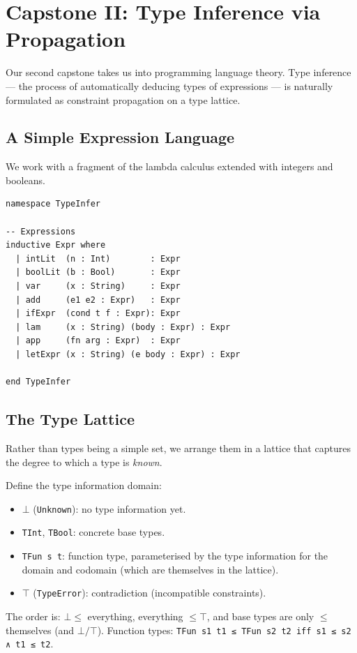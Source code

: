 \documentclass[12pt, a4paper, openright]{book}
\theoremstyle{thmstyle}
\theoremstyle{defstyle}
\newcommand{\lc}[1]{\texttt{#1}}
\newenvironment{defbox}[1][]{%
  \begin{tcolorbox}[defbox, title={Definition\ifx\\#1\\\else\ --- #1\fi}]%
}{\end{tcolorbox}}
\begin{document}
\chapter{Capstone II: Type Inference via Propagation}

Our second capstone takes us into programming language theory.
Type inference --- the process of automatically deducing types of expressions
--- is naturally formulated as constraint propagation on a type lattice.

\section{A Simple Expression Language}

We work with a fragment of the lambda calculus extended with integers and
booleans.

\begin{verbatim}
namespace TypeInfer

-- Expressions
inductive Expr where
  | intLit  (n : Int)        : Expr
  | boolLit (b : Bool)       : Expr
  | var     (x : String)     : Expr
  | add     (e1 e2 : Expr)   : Expr
  | ifExpr  (cond t f : Expr): Expr
  | lam     (x : String) (body : Expr) : Expr
  | app     (fn arg : Expr)  : Expr
  | letExpr (x : String) (e body : Expr) : Expr

end TypeInfer
\end{verbatim}

\section{The Type Lattice}

Rather than types being a simple set, we arrange them in a lattice that
captures the degree to which a type is \emph{known}.

\begin{defbox}[Flat Type Lattice]
  Define the type information domain:
  \begin{itemize}[nosep]
    \item $\bot$ (\lc{Unknown}): no type information yet.
    \item \lc{TInt}, \lc{TBool}: concrete base types.
    \item \lc{TFun s t}: function type, parameterised by the type information
          for the domain and codomain (which are themselves in the lattice).
    \item $\top$ (\lc{TypeError}): contradiction (incompatible constraints).
  \end{itemize}
  The order is: $\bot \leq$ everything, everything $\leq \top$, and
  base types are only $\leq$ themselves (and $\bot / \top$).
  Function types: \lc{TFun s1 t1 ≤ TFun s2 t2 iff s1 ≤ s2 ∧ t1 ≤ t2}.
\end{defbox}
\end{document}
